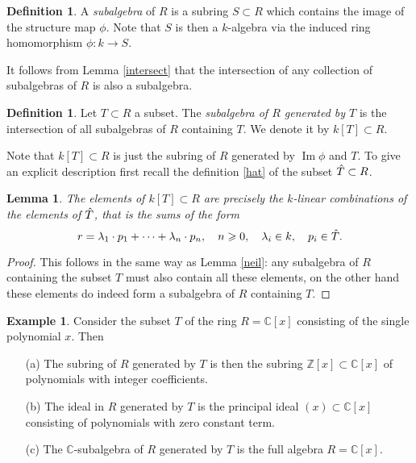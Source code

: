 \documentclass [12pt,oneside,a4paper,mathscr]{amsart}
\newtheorem{lemma}[thm]{Lemma}
\theoremstyle{definition}
\newtheorem{defn}[thm]{Definition}
\newtheorem{example}[thm]{Example}
\newcommand {\C}{\mathbb C}
\renewcommand{\geq}{\geqslant}
\newcommand{\Z}{\mathbb Z}
\newcommand{\im}{\operatorname{Im}}
\begin{document}
 \begin{defn}
 A \emph{subalgebra} of $R$ is a subring $S\subset R$ which contains the image of the structure map $\phi$. Note that $S$ is then  a $k$-algebra via the induced ring homomorphism $\phi\colon k\to S$.
\end{defn}

It follows from Lemma \ref{intersect} that the intersection of any collection of subalgebras of $R$  is also a subalgebra. 

\begin{defn}
Let  $T\subset R$ a subset. The \emph{subalgebra of $R$ generated by $T$} is the intersection of all subalgebras of $R$ containing $T$. We denote it by $k[T]\subset R$.
\end{defn}

Note that $k[T]\subset R$ is just the subring of $R$ generated by $\im \phi$ and $T$. To give an explicit description first recall the definition \eqref{hat} of the subset $\Hat{T}\subset R$.  

\begin{lemma}
The elements of $k[T]\subset R$ are precisely the $k$-linear combinations of the elements of $\Hat{T}$, that is the sums of the form
\[r=\lambda_1\cdot p_1+\cdots +\lambda_n\cdot p_n, \quad n\geq 0, \quad \lambda_i\in k, \quad p_i\in \Hat{T}.\]
\end{lemma}

\begin{proof}
This follows in the same way as Lemma \ref{neil}: any subalgebra of $R$ containing the subset $T$ must also contain all these elements, on the other hand these elements do indeed form a subalgebra of $R$ containing $T$. 
\end{proof}


\begin{example}
Consider the subset $T$ of the ring $R=\C[x]$ consisting of the single polynomial $x$. Then
\begin{itemize}
\item[(a)] The subring of $R$ generated by $T$ is then the subring $\Z[x]\subset \C[x]$ of polynomials with integer coefficients.
\smallskip
\item[(b)]  The ideal in $R$ generated by $T$ is the principal ideal $(x)\subset \C[x]$ consisting of polynomials with zero constant term.\smallskip

\item[(c)]The $\C$-subalgebra of $R$ generated by $T$ is the full algebra $R=\C[x]$.
\end{itemize}
\end{example}
\end{document}
